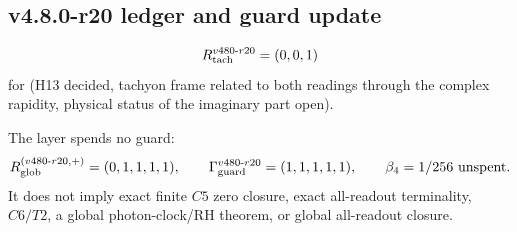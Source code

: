 \subsection*{v4.8.0-r20 ledger and guard update}
\label{subsec:v480-r20-ledger-guard}

\[
R_{\rm tach}^{v480\text{-}r20}=(0,0,1)
\]
for (H13 decided, tachyon frame related to both readings through the complex rapidity, physical status of the
imaginary part open).

The layer spends no guard:
\[
R_{\rm glob}^{(v480\text{-}r20,+)}=(0,1,1,1,1),
\qquad
\Gamma_{\rm guard}^{v480\text{-}r20}=(1,1,1,1,1),
\qquad
\beta_4=1/256\ \text{unspent}.
\]
It does not imply exact finite \(C5\) zero closure, exact all-readout terminality,
\(C6/T2\), a global photon-clock/RH theorem, or global all-readout closure.

